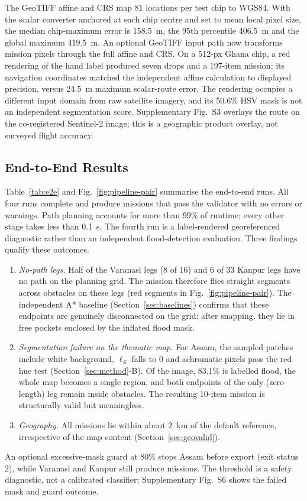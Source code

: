 The GeoTIFF affine and CRS map 81 locations per test chip to WGS84. With the scalar converter anchored at each chip centre and set to mean local pixel size, the median chip-maximum error is 158.5~m, the 95th percentile 406.5~m and the global maximum 419.5~m. An optional GeoTIFF input path now transforms mission pixels through the full affine and CRS. On a 512-px Ghana chip, a red rendering of the hand label produced seven drops and a 197-item mission; its navigation coordinates matched the independent affine calculation to displayed precision, versus 24.5~m maximum scalar-route error. The rendering occupies a different input domain from raw satellite imagery, and its 50.6\% HSV mask is not an independent segmentation score. Supplementary Fig.~S3 overlays the route on the co-registered Sentinel-2 image; this is a geographic product overlay, not surveyed flight accuracy.

\subsection{End-to-End Results}
\label{sec:e2e}
Table~\ref{tab:e2e} and Fig.~\ref{fig:pipeline-pair} summarise the end-to-end runs. All four runs complete and produce missions that pass the validator with no errors or warnings. Path planning accounts for more than 99\% of runtime; every other stage takes less than 0.1~s. The fourth run is a label-rendered georeferenced diagnostic rather than an independent flood-detection evaluation. Three findings qualify these outcomes.
\begin{enumerate}
\item \emph{No-path legs.} Half of the Varanasi legs (8 of 16) and 6 of 33 Kanpur legs have no path on the planning grid. The mission therefore flies straight segments across obstacles on these legs (red segments in Fig.~\ref{fig:pipeline-pair}). The independent A* baseline (Section~\ref{sec:baselines}) confirms that these endpoints are genuinely disconnected on the grid: after snapping, they lie in free pockets enclosed by the inflated flood mask.
\item \emph{Segmentation failure on the thematic map.} For Assam, the sampled patches include white background, $\ell_S$ falls to $0$ and achromatic pixels pass the red hue test (Section~\ref{sec:method}-B). Of the image, 83.1\% is labelled flood, the whole map becomes a single region, and both endpoints of the only (zero-length) leg remain inside obstacles. The resulting 10-item mission is structurally valid but meaningless.
\item \emph{Geography.} All missions lie within about 2~km of the default reference, irrespective of the map content (Section~\ref{sec:geovalid}).
\end{enumerate}
An optional excessive-mask guard at 80\% stops Assam before export (exit status 2), while Varanasi and Kanpur still produce missions. The threshold is a safety diagnostic, not a calibrated classifier; Supplementary Fig.~S6 shows the failed mask and guard outcome.


